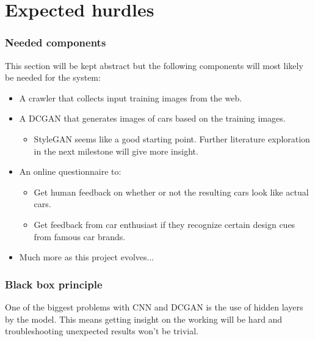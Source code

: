 \part{Expected hurdles}
\label{part:hurdles}


\section{Needed components}
\label{sec:needed_components}

This section will be kept abstract but the following components will most likely be needed for the system:
\begin{itemize}
    \item A crawler that collects input training images from the web.
    \item A DCGAN that generates images of cars based on the training images.
    \begin{itemize}
        \item StyleGAN seems like a good starting point. Further literature exploration in the next milestone will give more insight.
    \end{itemize}
    \item An online questionnaire to:
    \begin{itemize}
        \item Get human feedback on whether or not the resulting cars look like actual cars.
        \item Get feedback from car enthusiast if they recognize certain design cues from famous car brands.
    \end{itemize}
    \item Much more as this project evolves...
\end{itemize}


\section{Black box principle}
\label{sec:black_box}

One of the biggest problems with CNN and DCGAN is the use of hidden layers by the model.
This means getting insight on the working will be hard and troubleshooting unexpected results won't be trivial.

